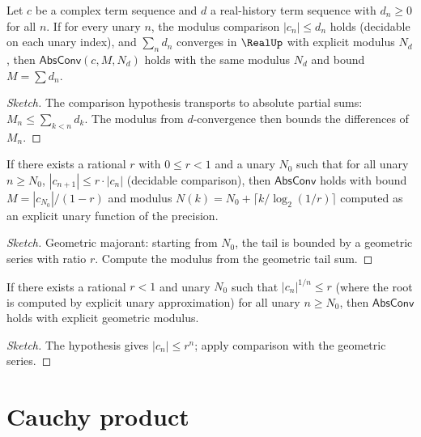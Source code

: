 \begin{theorem}
\label{thm:comparison-test}
Let \(c\) be a complex term sequence and \(d\) a real-history term sequence with \(d_n \geq 0\) for all \(n\). If for every unary \(n\), the modulus comparison \(|c_n| \leq d_n\) holds (decidable on each unary index), and \(\sum_n d_n\) converges in \(\RealUp\) with explicit modulus \(N_d\), then \(\mathsf{AbsConv}(c, M, N_d)\) holds with the same modulus \(N_d\) and bound \(M = \sum d_n\).
\end{theorem}
\begin{proof}[Sketch]
The comparison hypothesis transports to absolute partial sums: \(M_n \leq \sum_{k < n} d_k\). The modulus from \(d\)-convergence then bounds the differences of \(M_n\).
\end{proof}

\begin{theorem}
\label{thm:ratio-test}
If there exists a rational \(r\) with \(0 \leq r < 1\) and a unary \(N_0\) such that for all unary \(n \geq N_0\), \(|c_{n+1}| \leq r \cdot |c_n|\) (decidable comparison), then \(\mathsf{AbsConv}\) holds with bound \(M = |c_{N_0}| / (1 - r)\) and modulus \(N(k) = N_0 + \lceil k / \log_2(1/r) \rceil\) computed as an explicit unary function of the precision.
\end{theorem}
\begin{proof}[Sketch]
Geometric majorant: starting from \(N_0\), the tail is bounded by a geometric series with ratio \(r\). Compute the modulus from the geometric tail sum.
\end{proof}

\begin{lemma}
\label{lem:root-test}
If there exists a rational \(r < 1\) and unary \(N_0\) such that \(|c_n|^{1/n} \leq r\) (where the root is computed by explicit unary approximation) for all unary \(n \geq N_0\), then \(\mathsf{AbsConv}\) holds with explicit geometric modulus.
\end{lemma}
\begin{proof}[Sketch]
The hypothesis gives \(|c_n| \leq r^n\); apply comparison with the geometric series.
\end{proof}

\section{Cauchy product}

